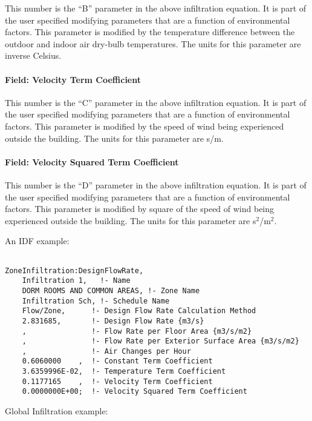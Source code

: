 This number is the ``B'' parameter in the above infiltration equation. It is part of the user specified modifying parameters that are a function of environmental factors. This parameter is modified by the temperature difference between the outdoor and indoor air dry-bulb temperatures. The units for this parameter are inverse Celsius.

\paragraph{Field: Velocity Term Coefficient}\label{field-velocity-term-coefficient}

This number is the ``C'' parameter in the above infiltration equation. It is part of the user specified modifying parameters that are a function of environmental factors. This parameter is modified by the speed of wind being experienced outside the building. The units for this parameter are s/m.

\paragraph{Field: Velocity Squared Term Coefficient}\label{field-velocity-squared-term-coefficient}

This number is the ``D'' parameter in the above infiltration equation. It is part of the user specified modifying parameters that are a function of environmental factors. This parameter is modified by square of the speed of wind being experienced outside the building. The units for this parameter are s\(^{2}\)/m\(^{2}\).

An IDF example:

\begin{lstlisting}

ZoneInfiltration:DesignFlowRate,
    Infiltration 1,   !- Name
    DORM ROOMS AND COMMON AREAS, !- Zone Name
    Infiltration Sch, !- Schedule Name
    Flow/Zone,      !- Design Flow Rate Calculation Method
    2.831685,       !- Design Flow Rate {m3/s}
    ,               !- Flow Rate per Floor Area {m3/s/m2}
    ,               !- Flow Rate per Exterior Surface Area {m3/s/m2}
    ,               !- Air Changes per Hour
    0.6060000    ,  !- Constant Term Coefficient
    3.6359996E-02,  !- Temperature Term Coefficient
    0.1177165    ,  !- Velocity Term Coefficient
    0.0000000E+00;  !- Velocity Squared Term Coefficient
\end{lstlisting}

Global Infiltration example:

